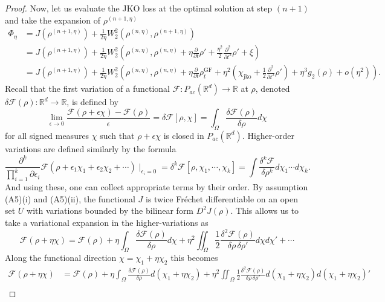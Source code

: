 \documentclass[reqno,11pt,letterpaper]{amsart}
\theoremstyle{plain}
\theoremstyle{definition}
\theoremstyle{remark}
\newcommand{\wass}{\mathrm{GF}}
\newcommand{\jkoreg}{\chi_{\mathrm{jko}}}
\begin{document}
\begin{proof}
Now, let us evaluate the JKO loss at the optimal solution at step $(n+1)$ and take the expansion of $\rho^{(n+1,\eta)}$ 
\begin{align*}
 \Phi_{\eta} &= J(\rho^{(n+1,\eta)} ) + \frac{1}{2 \eta} W_{2}^{2}(\rho^{(n, \eta)}, \rho^{(n+1,\eta)} ) \\
 & = J(\rho^{(n+1,\eta)} ) + \frac{1}{2 \eta} W_{2}^{2}\left(\rho^{(n, \eta)}, \rho^{(n,\eta)} + \eta \frac{\partial }{\partial t}\rho' + \frac{\eta^{2}}{2} \frac{\partial^{2} }{\partial t^{2}} \rho' + \xi \right) \\
 & = J(\rho^{(n+1,\eta)} ) + \frac{1}{2 \eta} W_{2}^{2}\left(\rho^{(n, \eta)}, \rho^{(n,\eta)} + \eta \frac{\partial }{\partial t} \rho^{\wass}_{t} + \eta^{2} \left( \jkoreg + \frac{1}{2} \frac{\partial^{2} }{\partial t^{2}} \rho'  \right) + \eta^{3} g_{2}(\rho) + o(\eta^{2})  \right).
\end{align*}
Recall that the first variation of a functional $\mathcal{F}: {P}_{ac}(\mathbb{R}^{d}) \to \mathbb{R}$ at $\rho$, denoted $\delta \mathcal{F}(\rho): \mathbb{R}^{d} \to \mathbb{R}$, is defined by
\[
\lim_{\epsilon \to 0} \frac{\mathcal{F}(\rho + \epsilon \chi) - \mathcal{F}(\rho)}{\epsilon} = 
\delta\mathcal{F} [\rho, \chi] =\int_{\Omega} \frac{\delta \mathcal{F}(\rho)}{\delta\rho} d\chi
\]
for all signed measures $\chi$ such that $\rho + \epsilon \chi$ is closed in ${P}_{ac}(\mathbb{R}^{d})$. Higher-order variations are defined similarly by the formula
\[
 \frac{\partial^{k} }{ \prod_{i=1}^{k} \partial \epsilon_{i}} \mathcal{F}(\rho+\epsilon_{1}\chi_{1} + \epsilon_{2} \chi_{2} + \cdots ) \mid_{\epsilon_{i} = 0} = \delta^{k} \mathcal{F}[\rho,\chi_{1},\cdots,\chi_{k}] = \int \frac{\delta^{k} \mathcal{F}}{ \delta \rho^{k}}  d\chi_{1} \cdots d\chi_{k}.
\]
And using these, one can collect appropriate terms by their order. By assumption (A5)(i) and (A5)(ii), the functional $J$ is twice Fréchet differentiable on an open set $U$ with variations bounded by the bilinear form $D^{2}J(\rho)$. This allows us to take a variational expansion in the higher-variations \cite{Courant_Hilbert_2009} as
\[
\mathcal{F}(\rho+\eta \chi) = \mathcal{F}(\rho) +
\eta\int_{\Omega} \frac{\delta \mathcal{F}(\rho)}{\delta\rho} d\chi + \eta^{2}\iint_{\Omega}\frac{1}{2}\frac{\delta^{2} \mathcal{F}(\rho)}{\delta\rho \,\delta\rho'} d\chi d\chi' + \cdots
\]
Along the functional direction $\chi = \chi_{1} + \eta \chi_{2}$ this becomes
\begin{align*}
\mathcal{F}(\rho+\eta \chi) &= \mathcal{F}(\rho) +
\eta\int_{\Omega} \frac{\delta \mathcal{F}(\rho)}{\delta\rho} d(\chi_{1} + \eta \chi_{2}) + \eta^{2}\iint_{\Omega}\frac{1}{2}\frac{\delta^{2} \mathcal{F}(\rho)}{\delta\rho \,\delta\rho'} d(\chi_{1} + \eta \chi_{2}) d(\chi_{1} + \eta \chi_{2})' \\

\end{align*}
\end{proof}
\end{document}
